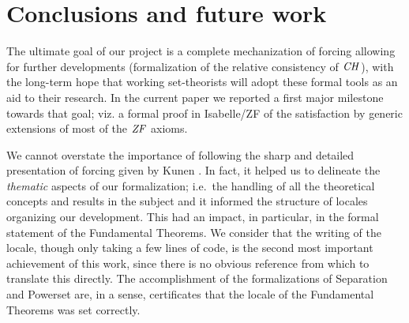 \section{Conclusions and future work}
\label{sec:conclusions-future-work}

The ultimate goal of our project is a complete mechanization of
forcing allowing for further developments (formalization of the
relative consistency of $\mathit{CH}$), with the long-term hope that 
working set-theorists will adopt these formal tools as an aid to their
research. In the current paper we reported a first major
milestone towards that goal; viz. a formal proof in Isabelle/ZF of the
satisfaction by generic extensions of most of the $\mathit{ZF}$ axioms.%

We cannot overstate the importance of following the sharp and detailed 
presentation of forcing given by
Kunen \cite{kunen2011set}. In fact, it helped us to delineate the
\emph{thematic} aspects of our formalization; i.e.~the handling of all
the theoretical concepts and results in the subject and it informed
the structure of locales organizing our development. This had an
impact, in particular, in the formal statement of the Fundamental
Theorems. We consider that the writing of the 
locale, though only taking a few lines of code, is the second most
important achievement of this work, since there is no obvious
reference from which to translate this directly. The accomplishment
of the formalizations of Separation and Powerset are, in a sense,
certificates that the locale of the Fundamental Theorems was set
correctly.



